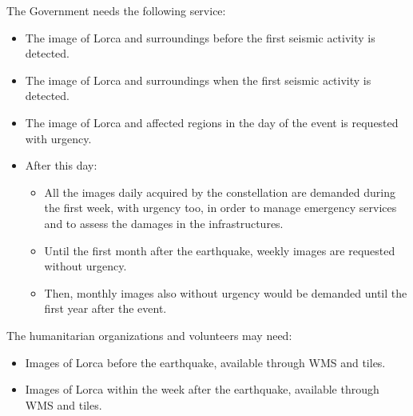 The Government needs the following service:
\begin{itemize}
\item The image of Lorca and surroundings before the first seismic activity is detected.
\item The image of Lorca and surroundings when the first seismic activity is detected.
\item The image of Lorca and affected regions in the day of the event is requested with urgency.
\item After this day:
\begin{itemize}
\item All the images daily acquired by the constellation are demanded during the first week, with urgency too, in order to manage emergency services and to assess the damages in the infrastructures. 
\item Until the first month after the earthquake, weekly images are requested without urgency. 
\item Then, monthly images also without urgency would be demanded until the
  first year after the event. 
\end{itemize}
\end{itemize}
The humanitarian organizations and volunteers may need:
\begin{itemize}
\item Images of Lorca before the earthquake, available through WMS and tiles.
\item Images of Lorca within the week after the earthquake, available through
  WMS and tiles.
\end{itemize}

